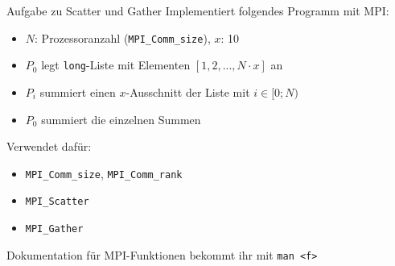 \documentclass{beamer}
\begin{document}
\begin{frame}{Aufgabe zu Scatter und Gather}
	Implementiert folgendes Programm mit MPI:

	\begin{itemize}
		\item $N$: Prozessoranzahl (\texttt{MPI_Comm_size}), $x$: 10
		\item $P_0$ legt \texttt{long}-Liste mit Elementen $[1, 2, ..., N \cdot x]$ an
		\item $P_i$ summiert einen $x$-Ausschnitt der Liste mit $i \in [0;N)$
		\item $P_0$ summiert die einzelnen Summen
	\end{itemize}

	Verwendet dafür:

	\begin{itemize}
		\item \texttt{MPI_Comm_size}, \texttt{MPI_Comm_rank}
		\item \texttt{MPI_Scatter}
		\item \texttt{MPI_Gather}
	\end{itemize}

	Dokumentation für MPI-Funktionen bekommt ihr mit \texttt{man <f>}
\end{frame}
\end{document}
